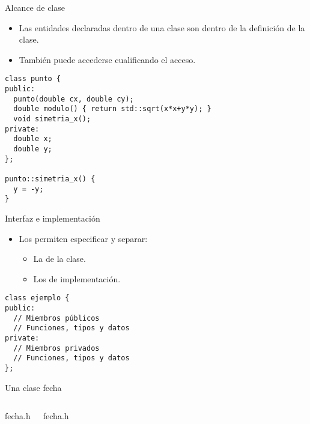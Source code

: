 \begin{frame}[t,fragile]{Alcance de clase}
\begin{itemize}
  \item Las entidades declaradas dentro de una clase son 
         dentro de la definición de la clase.
  \item También puede accederse cualificando el acceso.
\end{itemize}
\begin{lstlisting}
class punto {
public:
  punto(double cx, double cy);
  double modulo() { return std::sqrt(x*x+y*y); }
  void simetria_x();
private:
  double x;
  double y;
};

punto::simetria_x() {
  y = -y;
}

\end{lstlisting}
\end{frame}

\begin{frame}[t,fragile]{Interfaz e implementación}
\begin{itemize}
  \item Los  permiten especificar y separar:
    \begin{itemize}
      \item La  de la clase.
      \item Los  de implementación.
    \end{itemize}
\end{itemize}
\begin{lstlisting}
class ejemplo {
public:
  // Miembros públicos
  // Funciones, tipos y datos
private:
  // Miembros privados
  // Funciones, tipos y datos
};
\end{lstlisting}
\end{frame}

\begin{frame}[t]{Una clase fecha}

\begin{columns}[T]

\begin{block}{fecha.h}

\end{block}

\begin{block}{fecha.h}

\end{block}

\end{columns}

\end{frame}

